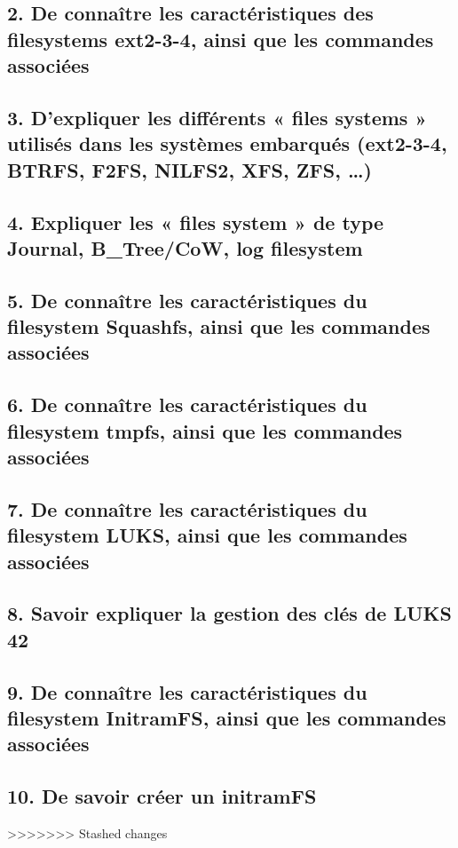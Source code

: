 \documentclass[resume]{subfiles}
\begin{document}
\subsection{2. De connaître les caractéristiques des filesystems ext2-3-4, ainsi que les commandes associées}


\subsection{3. D’expliquer les différents « files systems » utilisés dans les systèmes embarqués (ext2-3-4, BTRFS, F2FS, NILFS2, XFS, ZFS, …)}


\subsection{4. Expliquer les « files system » de type Journal, B_Tree/CoW, log filesystem}


\subsection{5. De connaître les caractéristiques du filesystem Squashfs, ainsi que les commandes associées}


\subsection{6. De connaître les caractéristiques du filesystem tmpfs, ainsi que les commandes associées}


\subsection{7. De connaître les caractéristiques du filesystem LUKS, ainsi que les commandes associées}


\subsection{8. Savoir expliquer la gestion des clés de LUKS 42}


\subsection{9. De connaître les caractéristiques du filesystem InitramFS, ainsi que les commandes associées}


\subsection{10. De savoir créer un initramFS}
>>>>>>> Stashed changes
\end{document}
